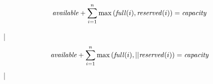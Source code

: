 

\bigskip


$${\it available} + \sum_{i=1}^n \max\left({\it full}(i), 
{\it reserved}(i)\right) = {\it capacity}$$

\respuestaS |$${\it available} + \sum_{i=1}^n 
\max\left({\it full}(i),|

\noindent|{\it reserved}(i)\right) = {\it capacity}$$|

\bye

